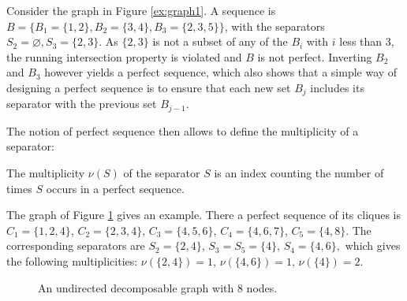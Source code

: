 Consider the graph in Figure \ref{ex:graph1}. A sequence is $B=\big\{B_1=\{1,2\}, B_2=\{3,4\},B_3=\{2,3,5\}\big\}$, with the separators $S_2=\varnothing, S_3=\{2,3\}$. As $\{2,3\}$ is not a subset of any of the $B_i$ with $i$ less than 3, the running intersection property is violated and $B$ is not perfect. Inverting $B_2$ and $B_3$ however yields a perfect sequence, which also shows that a simple way of designing a perfect sequence is to ensure that each new set $B_j$ includes its separator with the previous set $B_{j-1}$. 

The notion of perfect sequence then allows to define the multiplicity of a separator:
 \begin{definition}
 The multiplicity $\nu (S)$ of the separator $S$ is an index counting the number of times $S$ occurs in a perfect sequence.
 \end{definition}
 

The graph of Figure \ref{ex:graph2} gives an example. There a perfect sequence of its cliques is 
$C_1=\{1,2,4\}$, $C_2=\{2,3,4\}$, $C_3=\{4,5,6\}$, $C_4=\{4,6,7\}$, $C_5=\{4,8\}$. The corresponding separators are $S_2=\{2,4\}$, $S_3=S_5=\{4\}$, $S_4=\{4,6\},$ which gives the following multiplicities: $\nu(\{2,4\})=1$,  $\nu(\{4,6\})=1$, $\nu(\{4\})=2$.  

\begin{figure}[H]
 \begin{center}
 \caption{An undirected decomposable graph with 8 nodes.}
  \label{ex:graph2}
    \end{center}
\end{figure}

